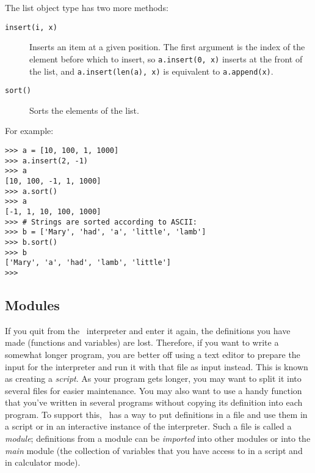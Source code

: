 The list object type has two more methods:
\begin{description}
\item[{\tt insert(i, x)}]
Inserts an item at a given position.
The first argument is the index of the element before which to insert,
so {\tt a.insert(0, x)} inserts at the front of the list, and
{\tt a.insert(len(a), x)} is equivalent to {\tt a.append(x)}.
\item[{\tt sort()}]
Sorts the elements of the list.
\end{description}
For example:
\begin{code}\begin{verbatim}
>>> a = [10, 100, 1, 1000]
>>> a.insert(2, -1)
>>> a
[10, 100, -1, 1, 1000]
>>> a.sort()
>>> a
[-1, 1, 10, 100, 1000]
>>> # Strings are sorted according to ASCII:
>>> b = ['Mary', 'had', 'a', 'little', 'lamb']
>>> b.sort()
>>> b
['Mary', 'a', 'had', 'lamb', 'little']
>>> 
\end{verbatim}\end{code}

\subsection{Modules}

If you quit from the \Python\ interpreter and enter it again, the
definitions you have made (functions and variables) are lost.
Therefore, if you want to write a somewhat longer program, you are
better off using a text editor to prepare the input for the interpreter
and run it with that file as input instead.
This is known as creating a
{\it script}.
As your program gets longer, you may want to split it into several files
for easier maintenance.
You may also want to use a handy function that you've written in several
programs without copying its definition into each program.
To support this, \Python\ has a way to put definitions in a file and use
them in a script or in an interactive instance of the interpreter.
Such a file is called a
{\it module};
definitions from a module can be
{\it imported}
into other modules or into the
{\it main}
module (the collection of variables that you have access to in
a script and in calculator mode).

